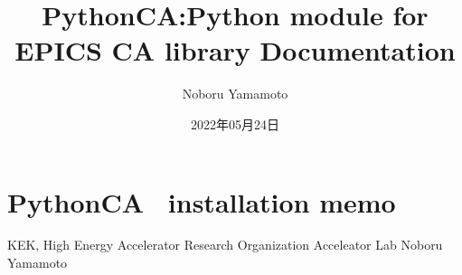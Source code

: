 \documentclass[a4paper,12pt,dvipdfmx]{sphinxhowto}
\title{PythonCA:Python module for EPICS CA library Documentation}
\date{2022年05月24日}
\author{Noboru Yamamoto}
\begin{document}
\pagestyle{empty}
\sphinxmaketitle
\pagestyle{plain}
\sphinxtableofcontents
\pagestyle{normal}
\label{\detokenize{index::doc}}


\sphinxstepscope


\section{Python\sphinxhyphen{}CA  installation memo}
\label{\detokenize{InstallationMemo:python-ca-installation-memo}}\label{\detokenize{InstallationMemo::doc}}
\sphinxAtStartPar
KEK, High Energy Accelerator Research Organization
Acceleator Lab
Noboru Yamamoto

\begin{DUlineblock}{0em}
\item[] 
\end{DUlineblock}
\end{document}

